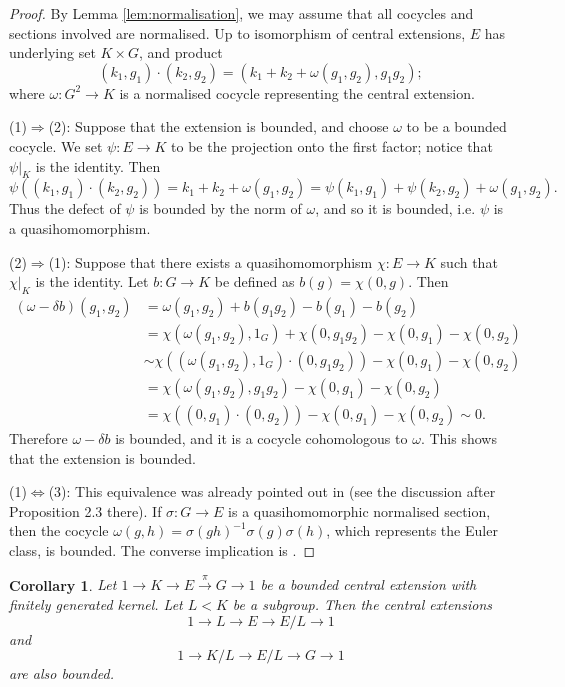 \documentclass[svgnames]{amsart}
\theoremstyle{plain}
\newtheorem{cor}[thm]{Corollary}
\theoremstyle{definition}
\begin{document}
\begin{proof}
    By Lemma \ref{lem:normalisation}, we may assume that all cocycles and sections involved are normalised.   
    Up to isomorphism of central extensions, $E$ has underlying set $K \times G$, and product
    \[(k_1, g_1) \cdot (k_2, g_2) = (k_1 + k_2 + \omega(g_1, g_2), g_1g_2);\]
    where $\omega \colon G^2 \to K$ is a normalised cocycle representing the central extension.

    (1)$\Rightarrow$(2): Suppose that the extension is bounded, and choose $\omega$ to be a bounded cocycle. We set $\psi \colon E \to K$ to be the projection onto the first factor; notice that $\psi|_K$ is the identity. Then
    \[\psi((k_1, g_1) \cdot (k_2, g_2)) = k_1 + k_2 + \omega(g_1, g_2) = \psi(k_1, g_1) + \psi (k_2, g_2) + \omega(g_1, g_2).\]
    Thus the defect of $\psi$ is bounded by the norm of $\omega$, and so it is bounded, i.e. $\psi$ is a quasihomomorphism.

    (2)$\Rightarrow$(1): Suppose that there exists a quasihomomorphism $\chi \colon E \to K$ such that $\chi|_K$ is the identity. Let $b \colon G \to K$ be defined as $b(g) = \chi(0, g)$. Then
    \begin{align*}
        (\omega - \delta b)(g_1, g_2) &= \omega(g_1, g_2) + b(g_1g_2) - b(g_1) - b(g_2) \\
        &= \chi(\omega(g_1, g_2), 1_G) + \chi(0, g_1g_2) - \chi(0, g_1) - \chi(0, g_2) \\
        &\sim \chi((\omega(g_1, g_2), 1_G)\cdot(0, g_1g_2)) - \chi(0, g_1) - \chi(0, g_2) \\
        &= \chi(\omega(g_1, g_2), g_1 g_2) - \chi(0, g_1) - \chi(0, g_2) \\
        &= \chi((0, g_1) \cdot (0, g_2)) - \chi(0, g_1) - \chi(0, g_2) \sim 0.
    \end{align*}
    Therefore $\omega - \delta b$ is bounded, and it is a cocycle cohomologous to $\omega$. This shows that the extension is bounded.

    (1)$\iff$(3): This equivalence was already pointed out in \cite{frigsisto} (see the discussion after Proposition 2.3 there). If $\sigma \colon G\to E$ is a quasihomomorphic normalised section, then the cocycle $\omega(g,h)=\sigma(gh)^{-1}\sigma(g)\sigma(h)$, which represents the Euler class, is bounded. The converse implication is \cite[Theorem C]{heuer}.
\end{proof}



\begin{cor}
\label{cor:decomposing:bounded:extensions}
    Let $1 \to K \to E \xrightarrow{\pi} G \to 1$ be a bounded central extension with finitely generated kernel. Let $L < K$ be a subgroup. Then the central extensions
    \[1 \to L \to E \to E/L \to 1\]
    and
    \[1 \to K/L \to E/L \to G \to 1\]
    are also bounded.
\end{cor}
\end{document}
